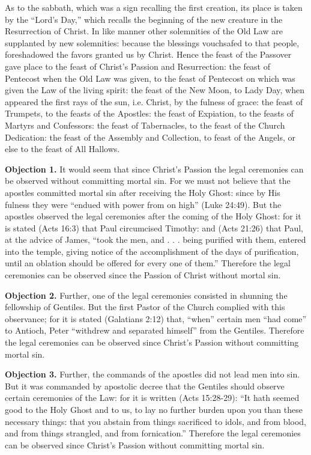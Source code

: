 As to the sabbath, which was a sign recalling the first creation, its place is taken by the ``Lord's Day,'' which recalls the beginning of the new creature in the Resurrection of Christ. In like manner other solemnities of the Old Law are supplanted by new solemnities: because the blessings vouchsafed to that people, foreshadowed the favors granted us by Christ. Hence the feast of the Passover gave place to the feast of Christ's Passion and Resurrection: the feast of Pentecost when the Old Law was given, to the feast of Pentecost on which was given the Law of the living spirit: the feast of the New Moon, to Lady Day, when appeared the first rays of the sun, i.e. Christ, by the fulness of grace: the feast of Trumpets, to the feasts of the Apostles: the feast of Expiation, to the feasts of Martyrs and Confessors: the feast of Tabernacles, to the feast of the Church Dedication: the feast of the Assembly and Collection, to feast of the Angels, or else to the feast of All Hallows.


\textbf{Objection 1.} It would seem that since Christ's Passion the legal ceremonies can be observed without committing mortal sin. For we must not believe that the apostles committed mortal sin after receiving the Holy Ghost: since by His fulness they were ``endued with power from on high'' (Luke 24:49). But the apostles observed the legal ceremonies after the coming of the Holy Ghost: for it is stated (Acts 16:3) that Paul circumcised Timothy: and (Acts 21:26) that Paul, at the advice of James, ``took the men, and . . . being purified with them, entered into the temple, giving notice of the accomplishment of the days of purification, until an oblation should be offered for every one of them.'' Therefore the legal ceremonies can be observed since the Passion of Christ without mortal sin.

\textbf{Objection 2.} Further, one of the legal ceremonies consisted in shunning the fellowship of Gentiles. But the first Pastor of the Church complied with this observance; for it is stated (Galatians 2:12) that, ``when'' certain men ``had come'' to Antioch, Peter ``withdrew and separated himself'' from the Gentiles. Therefore the legal ceremonies can be observed since Christ's Passion without committing mortal sin.

\textbf{Objection 3.} Further, the commands of the apostles did not lead men into sin. But it was commanded by apostolic decree that the Gentiles should observe certain ceremonies of the Law: for it is written (Acts 15:28-29): ``It hath seemed good to the Holy Ghost and to us, to lay no further burden upon you than these necessary things: that you abstain from things sacrificed to idols, and from blood, and from things strangled, and from fornication.'' Therefore the legal ceremonies can be observed since Christ's Passion without committing mortal sin.

